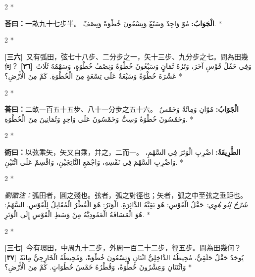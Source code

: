 \documentclass[11pt,a4paper]{article}
\newcommand{\ar}[1]{\arabicfont\beginR #1\endR}
\newcommand{\problemnum}[1]{\textbf{[\ignorespaces#1\unskip]}}
\newenvironment{bilingual}{%
  \begin{paracol}{2}%
  \switchcolumn[0]*%
}{%
  \end{paracol}%
}
\newcommand{\cnline}[1]{\switchcolumn[0]\noindent #1 \switchcolumn[1]}
\newcommand{\arline}[1]{\noindent\ar{#1} \switchcolumn[0]*}
\newenvironment{prob bilingual}{%
  \begin{paracol}{2}%
  \switchcolumn[0]*%
}{%
  \end{paracol}%
  \vspace{0.3em}%
}
\begin{document}
\begin{bilingual}
\cnline{\textcolor{answercolor}{\textbf{荅曰：}}一畝九十七步半。}
\arline{\textcolor{answercolor}{\textbf{الْجَوَابُ:}} مُوّ وَاحِدٌ وَسَبْعٌ وَتِسْعُونَ خُطْوَةً وَنِصْفٌ.}
\end{bilingual}

\begin{bilingual}
\cnline{\problemnum{三六}\, 又有弧田，弦七十八步、二分步之一，矢十三步、九分步之七。問為田幾何？}
\arline{\problemnum{٣٦}\, وَفِي حَقْلُ قَوْسٍ آخَرَ، وَتَرُهُ ثَمَانٍ وَسَبْعُونَ خُطْوَةً وَنِصْفُ خُطْوَةٍ، وَسَهْمُهُ ثَلَاثَ عَشْرَةَ خُطْوَةً وَسَبْعَةٌ عَلَى تِسْعَةٍ مِنَ الْخُطْوَةِ. كَمْ مِنَ الْأَرْضِ؟}
\end{bilingual}

\begin{bilingual}
\cnline{\textcolor{answercolor}{\textbf{荅曰：}}二畝一百五十五步、八十一分步之五十六。}
\arline{\textcolor{answercolor}{\textbf{الْجَوَابُ:}} مُوّانِ وَمِائَةٌ وَخَمْسٌ وَخَمْسُونَ خُطْوَةً وَسِتٌّ وَخَمْسُونَ عَلَى وَاحِدٍ وَثَمَانِينَ مِنَ الْخُطْوَةِ.}
\end{bilingual}

\begin{bilingual}
\cnline{%
\textcolor{methodcolor}{\textbf{術曰：}}以弦乘矢，矢又自乘，并之，二而一。
}
\arline{%
\textcolor{methodcolor}{\textbf{الطَّرِيقَةُ:}} اضْرِبِ الْوَتَرَ فِي السَّهْمِ، وَاضْرِبِ السَّهْمَ فِي نَفْسِهِ، وَاجْمَعِ النَّاتِجَيْنِ، وَاقْسِمْ عَلَى اثْنَيْنِ.
}
\end{bilingual}

\begin{bilingual}
\cnline{%
\textcolor{commentarycolor}{\small\textit{劉徽注：}}弧田者，圓之殘也。弦者，弧之對徑也；矢者，弧之中至弦之垂距也。
}
\arline{%
\textcolor{commentarycolor}{\small\textit{شَرْحُ لِيُو هُوِي:}} حَقْلُ الْقَوْسِ: هُوَ بَقِيَّةُ الدَّائِرَةِ. الْوَتَرُ: هُوَ الْقُطْرُ الْمُقَابِلُ لِلْقَوْسِ. السَّهْمُ: هُوَ الْمَسَافَةُ الْعَمُودِيَّةُ مِنْ وَسَطِ الْقَوْسِ إِلَى الْوَتَرِ.
}
\end{bilingual}

\begin{bilingual}
\cnline{\problemnum{三七}\, 今有環田，中周九十二步，外周一百二十二步，徑五步。問為田幾何？}
\arline{\problemnum{٣٧}\, يُوجَدُ حَقْلٌ حَلَقِيٌّ، مُحِيطُهُ الدَّاخِلِيُّ اثْنَانِ وَتِسْعُونَ خُطْوَةً، وَمُحِيطُهُ الْخَارِجِيُّ مِائَةٌ وَاثْنَتَانِ وَعِشْرُونَ خُطْوَةً، وَقُطْرُهُ خَمْسُ خُطُوَاتٍ. كَمْ مِنَ الْأَرْضِ؟}
\end{bilingual}
\end{document}
